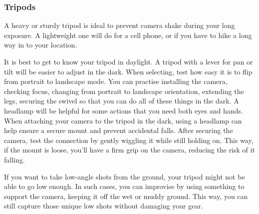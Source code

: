 \documentclass{article}
\begin{document}
\subsubsection{Tripods}


A heavy or sturdy tripod is ideal to prevent camera shake during your long exposure. A lightweight one will do for a cell phone, or if you have to hike a long way in to your location. 

It is best to get to know your tripod in daylight. A tripod with a lever for pan or tilt will be easier to adjust in the dark. When selecting, test how easy it is to flip from portrait to landscape mode. You can practise installing the camera, checking focus, changing from portrait to landscape orientation, extending the legs, securing the swivel so that you can do all of these things in the dark. A headlamp will be helpful for some actions that you need both eyes and  hands. When attaching your camera to the tripod in the dark, using a headlamp can help ensure a secure mount and prevent accidental falls. After securing the camera, test the connection by gently wiggling it while still holding on. This way, if the mount is loose, you'll have a firm grip on the camera, reducing the risk of it falling.

If you want to take low-angle shots from the ground, your tripod might not be able to go low enough. In such cases, you can improvise by using something to support the camera, keeping it off the wet or muddy ground. This way, you can still capture those unique low shots without damaging your gear.
\end{document}

